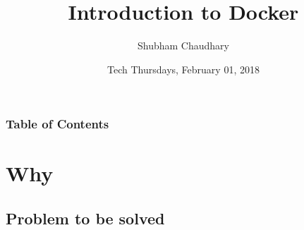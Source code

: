 \documentclass[mathserif,serif]{beamer}
\title[Docker]{Introduction to Docker}
\author[Shubham Chaudhary]{Shubham Chaudhary\inst{1}}
\institute[Zomato Media Pvt.~ Ltd.]{\inst{1} Zomato Media Pvt.~ Ltd.~}
\date[February 2018]{Tech Thursdays, February 01, 2018}
\begin{document}
    \frame{\titlepage}
    \begin{frame}
        \frametitle{Table of Contents}
    \end{frame}

    \section{Why}\label{sec:why}
    \subsection{Problem to be solved}\label{subsec:problemToBeSolved}
\end{document}
